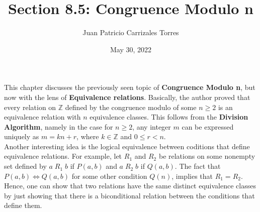 \documentclass[12pt]{article}
\newcommand{\Z}{\mathbb{Z}}
\begin{document}
  
 \title{Section 8.5: Congruence Modulo n}
 \author{Juan Patricio Carrizales Torres}
\date{May 30, 2022}
\maketitle

This chapter discusses the previously seen topic of \textbf{Congruence Modulo n}, but now with the lens of
\textbf{Equivalence relations}. Basically, the author proved that every relation on $\Z$
defined by the congruence modulo of some $n\geq 2$ is an equivalence relation with $n$ equivalence
classes. This follows from the \textbf{Division Algorithm}, namely in the case for $n\geq 2$, any integer $m$ can be expressed uniquely 
as $m=kn+r$, where $k\in \Z$ and $0\leq r < n$.\\

Another interesting idea is the logical equivalence between coditions that define equivalence relations.
For example, let $R_{1}$ and $R_{2}$ be relations on some nonempty set defined by $a\; R_{1} \;b$ if $P(a,b)$ and $a\; R_{2} \;b$ if $Q(a,b)$. The fact that 
$P(a,b) \iff Q(a,b)$ for some other condition $Q(n)$, implies that $R_{1} = R_{2}$. 
Hence, one can show that two relations have the same distinct equivalence classes by just showing that there is a 
biconditional relation between the conditions that define them.
\end{document}
